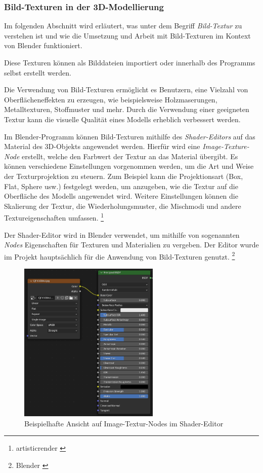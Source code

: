 \subsubsection{Bild-Texturen in der 3D-Modellierung} \label{sec:bildtextures}
Im folgenden Abschnitt wird erläutert, was unter dem Begriff \textit{Bild-Textur} zu verstehen ist und wie die Umsetzung und Arbeit mit Bild-Texturen im Kontext von Blender funktioniert.

Diese Texturen können als Bilddateien importiert oder innerhalb des Programms selbst erstellt werden.

Die Verwendung von Bild-Texturen ermöglicht es Benutzern, eine Vielzahl von Oberflächeneffekten zu erzeugen, wie beispielsweise Holzmaserungen, Metalltexturen, Stoffmuster und mehr. Durch die Verwendung einer geeigneten Textur kann die visuelle Qualität eines Modells erheblich verbessert werden.

Im Blender-Programm können Bild-Texturen mithilfe des \textit{Shader-Editors} auf das Material des 3D-Objekts angewendet werden. Hierfür wird eine \textit{Image-Texture-Node} erstellt, welche den Farbwert der Textur an das Material übergibt. Es können verschiedene Einstellungen vorgenommen werden, um die Art und Weise der Texturprojektion zu steuern. Zum Beispiel kann die Projektionsart (Box, Flat, Sphere usw.) festgelegt werden, um anzugeben, wie die Textur auf die Oberfläche des Modells angewendet wird. Weitere Einstellungen können die Skalierung der Textur, die Wiederholungsmuster, die Mischmodi und andere Textureigenschaften umfassen. \footnote{artisticrender \cite{Bild-Texturen}}

Der Shader-Editor wird in Blender verwendet, um mithilfe von sogenannten \textit{Nodes} Eigenschaften für Texturen und Materialien zu vergeben. Der Editor wurde im Projekt hauptsächlich für die Anwendung von Bild-Texturen genutzt. \footnote{Blender \cite{Node-Introduction}}

\begin{figure}[H]
    \centering
    \includegraphics[width=0.6\textwidth]{images/shadereditor.png}
    \caption{Beispielhafte Ansicht auf Image-Textur-Nodes im Shader-Editor}
    \label{fig:shadereditor}
\end{figure}

